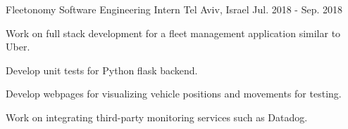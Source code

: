 \begin{cventries}
  \cventry
    {Fleetonomy} %
    {Software Engineering Intern} %
    {Tel Aviv, Israel} %
    {Jul. 2018 - Sep. 2018} %
    {
      \begin{cvitems} %
        \item {Work on full stack development for a fleet management application similar to Uber.}
        \item {Develop unit tests for Python flask backend.}
        \item {Develop webpages for visualizing vehicle positions and movements for testing.}
        \item {Work on integrating third-party monitoring services such as Datadog.}
      \end{cvitems}
    }
    
\end{cventries}
